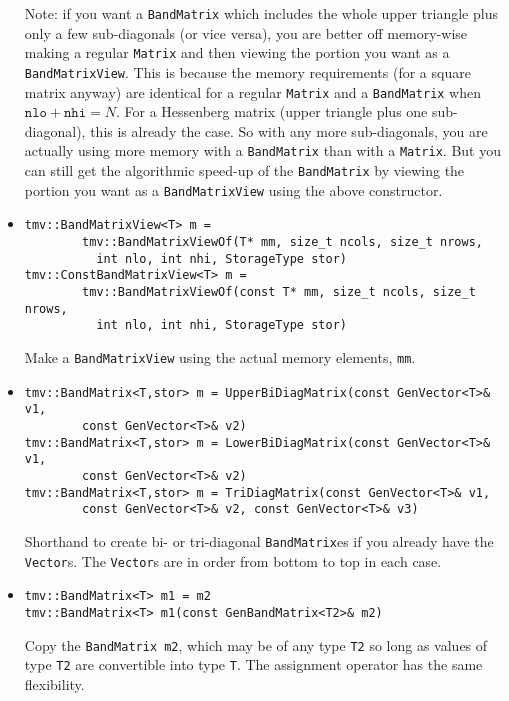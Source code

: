 \documentclass[twoside,letterpaper,11pt]{article}
\renewcommand{\tt}[1]{{\texttt {#1}}}
\begin{document}
\begin{itemize}
Note: if you want a \tt{BandMatrix} which includes the whole upper triangle
plus only a few sub-diagonals (or vice versa), 
you are better off memory-wise making a regular 
\tt{Matrix} and then viewing the portion you want as a \tt{BandMatrixView}.
This is because the memory requirements (for a square matrix anyway)
are identical for a regular \tt{Matrix} and a \tt{BandMatrix} when
$\tt{nlo} + \tt{nhi} = N$.  For a Hessenberg matrix (upper triangle plus 
one sub-diagonal),
this is already the case.  So with any more sub-diagonals, you are actually using
more memory with a \tt{BandMatrix} than with a \tt{Matrix}.  But you can still get the 
algorithmic speed-up of the \tt{BandMatrix} by viewing the portion you want
as a \tt{BandMatrixView} using the above constructor.

\item
\begin{verbatim}
tmv::BandMatrixView<T> m = 
        tmv::BandMatrixViewOf(T* mm, size_t ncols, size_t nrows, 
          int nlo, int nhi, StorageType stor)
tmv::ConstBandMatrixView<T> m = 
        tmv::BandMatrixViewOf(const T* mm, size_t ncols, size_t nrows, 
          int nlo, int nhi, StorageType stor)
\end{verbatim}
Make a \tt{BandMatrixView} using the actual memory elements, \tt{mm}.

\item
\begin{verbatim}
tmv::BandMatrix<T,stor> m = UpperBiDiagMatrix(const GenVector<T>& v1, 
        const GenVector<T>& v2)
tmv::BandMatrix<T,stor> m = LowerBiDiagMatrix(const GenVector<T>& v1, 
        const GenVector<T>& v2)
tmv::BandMatrix<T,stor> m = TriDiagMatrix(const GenVector<T>& v1,
        const GenVector<T>& v2, const GenVector<T>& v3)
\end{verbatim}
Shorthand to create bi- or tri-diagonal \tt{BandMatrix}es if you already have the 
\tt{Vector}s.  The \tt{Vector}s are in order from bottom to top in each case.

\item
\begin{verbatim}
tmv::BandMatrix<T> m1 = m2
tmv::BandMatrix<T> m1(const GenBandMatrix<T2>& m2)
\end{verbatim}
Copy the \tt{BandMatrix m2}, which may be of any type \tt{T2} so long
as values of type \tt{T2} are convertible into type \tt{T}.
The assignment operator has the same flexibility.

\end{itemize}
\end{document}
